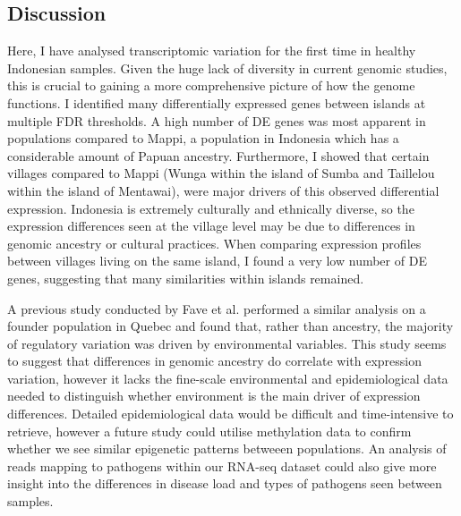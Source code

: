 \documentclass[12pt,a4paper,titlepage,twoside,openright]{book}
\begin{document}
\begin{mainmatter}
{\chapter{Discussion}\label{}


Here, I have analysed transcriptomic variation for the first time in healthy Indonesian samples. Given the huge lack of diversity in current genomic studies, this is crucial to gaining a more comprehensive picture of how the genome functions. I identified many differentially expressed genes between islands at multiple FDR thresholds. A high number of DE genes was most apparent in populations compared to Mappi, a population in Indonesia which has a considerable amount of Papuan ancestry. Furthermore, I showed that certain villages compared to Mappi (Wunga within the island of Sumba and Taillelou within the island of Mentawai), were major drivers of this observed differential expression. Indonesia is extremely culturally and ethnically diverse, so the expression differences seen at the village level may be due to differences in genomic ancestry or cultural practices. 
When comparing expression profiles between villages living on the same island, I found a very low number of DE genes, suggesting that many similarities within islands remained.

A previous study conducted by Fave et al. \cite{fave2018gene} performed a similar analysis on a founder population in Quebec and found that, rather than ancestry, the majority of regulatory variation was driven by environmental variables. This study seems to suggest that differences in genomic ancestry do correlate with expression variation, however it lacks the fine-scale environmental and epidemiological data needed to distinguish whether environment is the main driver of expression differences. Detailed epidemiological data would be difficult and time-intensive to retrieve, however a future study could utilise methylation data to confirm whether we see similar epigenetic patterns betweeen populations. An analysis of reads mapping to pathogens within our RNA-seq dataset could also give more insight into the differences in disease load and types of pathogens seen between samples. 

}
\end{mainmatter}
\end{document}
